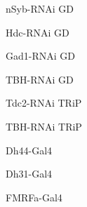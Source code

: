 \documentclass[17pt]{extarticle}
\begin{document}
\vspace*{\fill}\begin{normalsize}
nSyb-RNAi GD \\[0.5em]
\end{normalsize}
\footnotesize
\vspace*{\fill}
\newpage{}
\vspace*{\fill}\begin{normalsize}
Hdc-RNAi GD \\[0.5em]
\end{normalsize}
\footnotesize
\vspace*{\fill}
\newpage{}
\vspace*{\fill}\begin{normalsize}
Gad1-RNAi GD \\[0.5em]
\end{normalsize}
\footnotesize
\vspace*{\fill}
\newpage{}
\vspace*{\fill}\begin{normalsize}
TBH-RNAi GD \\[0.5em]
\end{normalsize}
\footnotesize
\vspace*{\fill}
\newpage{}
\vspace*{\fill}\begin{normalsize}
Tdc2-RNAi TRiP \\[0.5em]
\end{normalsize}
\footnotesize
\vspace*{\fill}
\newpage{}
\vspace*{\fill}\begin{normalsize}
TBH-RNAi TRiP \\[0.5em]
\end{normalsize}
\footnotesize
\vspace*{\fill}
\newpage{}
\vspace*{\fill}\begin{large}
Dh44-Gal4 \\[0.5em]
\end{large}
\footnotesize
\vspace*{\fill}
\newpage{}
\vspace*{\fill}\begin{large}
Dh31-Gal4 \\[0.5em]
\end{large}
\footnotesize
\vspace*{\fill}
\newpage{}
\vspace*{\fill}\begin{large}
FMRFa-Gal4 \\[0.5em]
\end{large}
\end{document}
